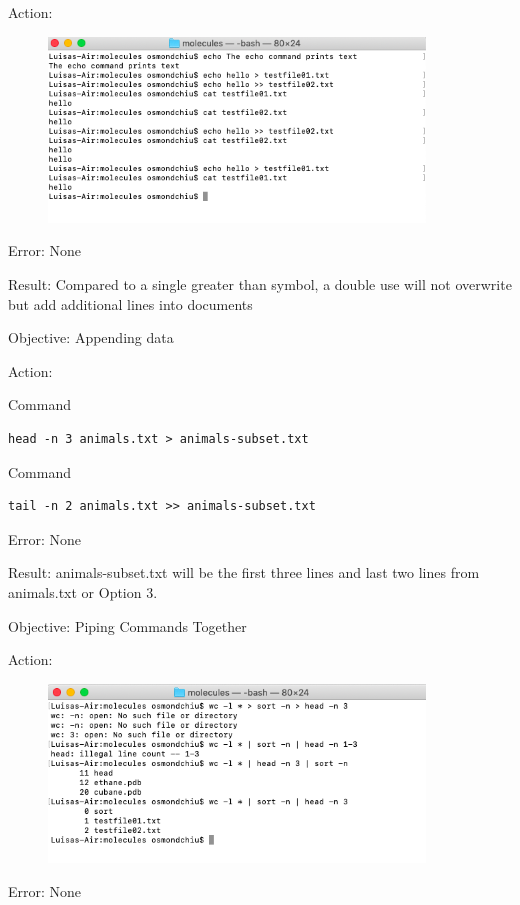 \documentclass{article}
\begin{document}
Action:\par
\begin{figure}[htp]
    \centering
    \includegraphics[width=10cm]{Screenshot9.png}
    \label{fig:ls-9}
\end{figure}
Error: None \par
Result: Compared to a single greater than symbol, a double use will not overwrite but add additional lines into documents

Objective: Appending data

Action:

Command \begin{verbatim}head -n 3 animals.txt > animals-subset.txt\end{verbatim}

Command \begin{verbatim}tail -n 2 animals.txt >> animals-subset.txt\end{verbatim}

Error: None

Result: animals-subset.txt will be the first three lines and last two lines from animals.txt or Option 3.\par

Objective: Piping Commands Together\par

Action:\par
\begin{figure}[htp]
    \centering
    \includegraphics[width=10cm]{Screenshot10.png}
    \label{fig:ls-10}
\end{figure}
Error: None \par
\end{document}
